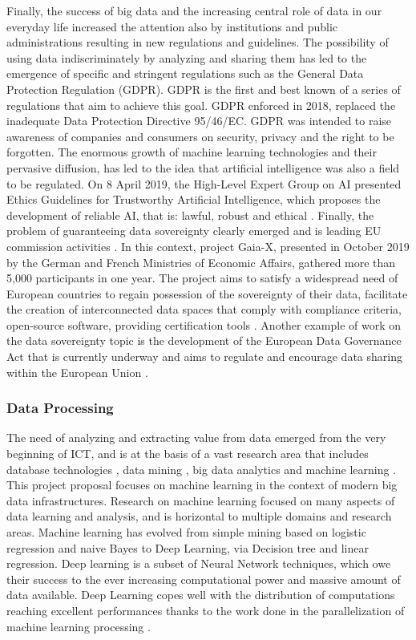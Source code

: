 Finally, the success of big data and the increasing central role of data in our everyday life increased the attention also by institutions and public administrations resulting in new regulations and guidelines.
%
The possibility of using data indiscriminately by analyzing and sharing them has led to the emergence of specific and stringent regulations such as the General Data Protection Regulation (GDPR)\cite{gdpr}. GDPR is the first and best known of a series of regulations that aim to achieve this goal. GDPR enforced in 2018, replaced the inadequate Data Protection Directive 95/46/EC. GDPR was intended to raise awareness of companies and consumers on security, privacy and the right to be forgotten.
%
The enormous growth of machine learning technologies and their pervasive diffusion, has led to the idea that artificial intelligence was also a field to be regulated. On 8 April 2019, the High-Level Expert Group on AI presented Ethics Guidelines for Trustworthy Artificial Intelligence, which proposes the development of reliable AI, that is: lawful, robust and ethical \cite{euai}.
%
Finally, the problem of guaranteeing data sovereignty clearly emerged and is leading EU commission activities \cite{pedreira2021review}. In this context, project Gaia-X, presented in October 2019 by the German and French Ministries of Economic Affairs, gathered more than 5,000 participants in one year. The project aims to satisfy a widespread need of European countries to regain possession of the sovereignty of their data, facilitate the creation of interconnected data spaces that comply with compliance criteria, open-source software, providing certification tools \cite{gaiax}. Another example of work on the data sovereignty topic is the development of the European Data Governance Act that is currently underway and aims to regulate and encourage data sharing within the European Union \cite{edca}.
\subsubsection{Data Processing}
The need of analyzing and extracting value from data emerged from the very beginning of ICT,
and is at the basis of a vast research area that includes database technologies \cite{palanisamy2020survey},
data mining \cite{jain2013data,castano2017exploratory},
big data analytics \cite{tsai2015big} and machine learning \cite{qiu2016survey}.
This project proposal focuses on machine learning in the context of modern big data infrastructures.
Research on machine learning focused on many aspects of data learning and analysis,
and is horizontal to multiple domains and research areas.
Machine learning has evolved from simple mining based on logistic regression and naive Bayes to Deep Learning,
via Decision tree and linear regression.
Deep learning is a subset of Neural Network techniques,
which owe their success to the ever increasing computational power and massive amount of data available.
Deep Learning copes well with the distribution of computations reaching excellent performances thanks to the work done in the parallelization of machine learning processing \cite{verbraeken2020survey, Goodfellow-et-al-2016,wu2022survey}.

